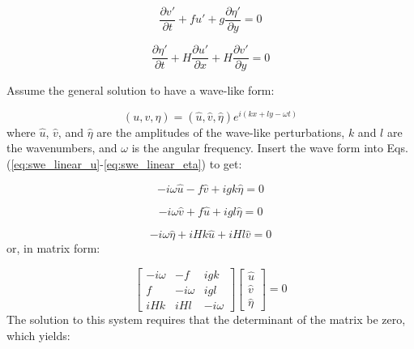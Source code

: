 \documentclass[12pt]{article}
\numberwithin{equation}{section}
\numberwithin{figure}{section}
\numberwithin{table}{section}
\begin{document}
\begin{equation}
  \frac{\partial v'}{\partial t} + f u' + g \frac{\partial \eta'}{\partial y} = 0
  \label{eq:swe_linear_v}
\end{equation}

\begin{equation}
  \frac{\partial \eta'}{\partial t} + H \frac{\partial u'}{\partial x} + H \frac{\partial v'}{\partial y} = 0
  \label{eq:swe_linear_eta}
\end{equation}

Assume the general solution to have a wave-like form:

\begin{equation}
  (u, v, \eta) = (\widehat{u}, \widehat{v}, \widehat{\eta}) e^{i(kx + ly - \omega t)}
\end{equation}
where $\widehat{u}$, $\widehat{v}$, and $\widehat{\eta}$ are the amplitudes of the
wave-like perturbations, $k$ and $l$ are the wavenumbers, and $\omega$ is the
angular frequency.
Insert the wave form into Eqs. (\ref{eq:swe_linear_u}-\ref{eq:swe_linear_eta})
to get:

\begin{equation}
  - i \omega \widehat{u} - f \widehat{v} + i g k \widehat{\eta} = 0
\end{equation}

\begin{equation}
  - i \omega \widehat{v} + f \widehat{u} + i g l \widehat{\eta} = 0
\end{equation}

\begin{equation}
  - i \omega \widehat{\eta} + i H k \widehat{u} + i H l \widehat{v} = 0
\end{equation}
or, in matrix form:

\begin{equation}
  \begin{bmatrix}
    - i \omega & - f        & i g k \\
    f          & - i \omega & i g l \\
    i H k      & i H l      & - i \omega
  \end{bmatrix}
  \begin{bmatrix}
    \widehat{u} \\
    \widehat{v} \\
    \widehat{\eta}
  \end{bmatrix} = 0
\end{equation}
The solution to this system requires that the determinant of the matrix be zero,
which yields:
\end{document}
